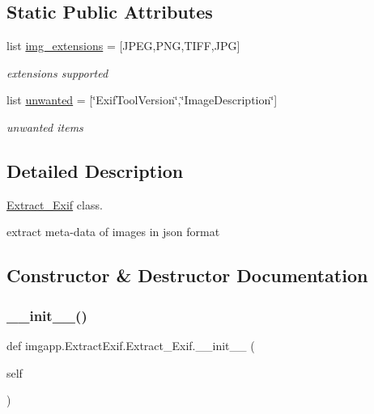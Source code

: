 \subsection*{Static Public Attributes}
\begin{DoxyCompactItemize}
\item 
list \hyperlink{classimgapp_1_1ExtractExif_1_1Extract__Exif_a2ab3a4413a5b50c8b9f350beba206141}{img\+\_\+extensions} = \mbox{[}\textquotesingle{}J\+P\+EG\textquotesingle{},\textquotesingle{}P\+NG\textquotesingle{},\textquotesingle{}T\+I\+FF\textquotesingle{},\textquotesingle{}J\+PG\textquotesingle{}\mbox{]}
\begin{DoxyCompactList}\small\item\em extensions supported \end{DoxyCompactList}\item 
list \hyperlink{classimgapp_1_1ExtractExif_1_1Extract__Exif_a5d96b6e5f57d4975b703d785b32428e0}{unwanted} = \mbox{[}\char`\"{}Exif\+Tool\+Version\char`\"{},\char`\"{}Image\+Description\char`\"{}\mbox{]}
\begin{DoxyCompactList}\small\item\em unwanted items \end{DoxyCompactList}\end{DoxyCompactItemize}


\subsection{Detailed Description}
\hyperlink{classimgapp_1_1ExtractExif_1_1Extract__Exif}{Extract\+\_\+\+Exif} class. 

extract meta-\/data of images in json format 

\subsection{Constructor \& Destructor Documentation}
\mbox{\label{classimgapp_1_1ExtractExif_1_1Extract__Exif_af59bbee67b855be06d4c19facad27933}} 
\subsubsection{\texorpdfstring{\+\_\+\+\_\+init\+\_\+\+\_\+()}{\_\_init\_\_()}}
{\footnotesize\ttfamily def imgapp.\+Extract\+Exif.\+Extract\+\_\+\+Exif.\+\_\+\+\_\+init\+\_\+\+\_\+ (\begin{DoxyParamCaption}\item[{}]{self }\end{DoxyParamCaption})}



